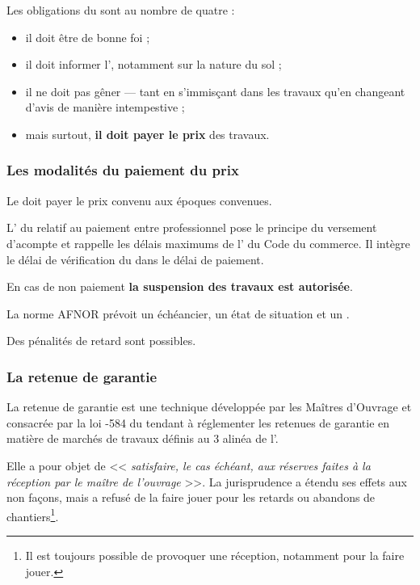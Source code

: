 			Les obligations du \Mo sont au nombre de quatre :
			\begin{itemize}
				\item il doit être de bonne foi ;
				\item il doit informer l'\E, notamment sur la nature du sol ;
				\item il ne doit pas gêner --- tant en s'immisçant dans les travaux qu'en changeant d'avis de manière intempestive ;
				\item mais surtout, \textbf{il doit payer le prix} des travaux.
			\end{itemize}

			\subsubsection{Les modalités du paiement du prix}

				Le \Mo doit payer le prix convenu aux époques convenues.

				L' du \cch relatif au paiement entre professionnel pose le principe du versement d’acompte et rappelle les délais maximums de l' du Code du commerce. Il intègre le délai de vérification du \Moe dans le délai de paiement.

				En cas de non paiement \textbf{la suspension des travaux est autorisée}.

				La norme AFNOR prévoit un échéancier, un état de situation et un \dgd.

				Des pénalités de retard sont possibles.

			\subsubsection{La retenue de garantie}\label{retenueLegaleDeGarantie}

				La retenue de garantie est une technique développée par les Maîtres d'Ouvrage et consacrée par la loi -584 du  tendant à réglementer les retenues de garantie en matière de marchés de travaux définis au 3\ieme{} alinéa de l'.

				Elle a pour objet de << \textit{satisfaire, le cas échéant, aux réserves faites à la réception par le maître de l'ouvrage} >>. La jurisprudence a étendu ses effets aux non façons, mais a refusé de la faire jouer pour les retards ou abandons de chantiers\footnote{Il est toujours possible de provoquer une réception, notamment pour la faire jouer.}.

